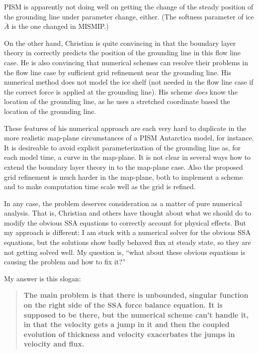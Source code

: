 \documentclass[11pt,final]{amsart}
\begin{document}
PISM is apparently not doing well on getting the change of the steady position of the grounding line under parameter change, either.  (The softness parameter of ice $\bar A$ is the one changed in MISMIP.)

On the other hand, Christian is quite convincing in \cite{SchoofMarine2} that the boundary layer theory in \cite{SchoofMarine1} correctly predicts the position of the grounding line in this flow line case.  He is also convincing that numerical schemes can resolve their problems in the flow line case by sufficient grid refinement near the grounding line.  His numerical method does not model the ice shelf (not needed in the flow line case if the correct force is applied at the grounding line).  His scheme \emph{does} know the location of the grounding line, as he uses a stretched coordinate based the location of the grounding line.

These features of his numerical approach are each very hard to duplicate in the more realistic map-plane circumstances of a PISM Antarctica model, for instance.  It is desireable to avoid explicit parameterization of the grounding line as, for each model time, a curve in the map-plane.  It is not clear in several ways how to extend the boundary layer theory in \cite{SchoofMarine1} to the map-plane case.  Also the proposed grid refinement is much harder in the map-plane, both to implement a scheme and to make computation time scale well as the grid is refined.

In any case, the problem deserves consideration as a matter of pure numerical analysis.  That is, Christian and others have thought about what we should do to modify the obvious SSA equations to correctly account for physical effects.  But my approach is different: I am stuck with a numerical solver for the obvious SSA equations, but the solutions show badly behaved flux at steady state, so they are not getting solved well.  My question is, ``what about these obvious equations is causing the problem and how to fix it?''

My answer is this slogan:
\begin{quote}
\textbf{The main problem is that there is unbounded, singular function on the right side of the SSA force balance equation.  It is supposed to be there, but the numerical scheme can't handle it, in that the velocity gets a jump in it and then the coupled evolution of thickness and velocity exacerbates the jumps in velocity and flux.}
\end{quote}
\end{document}
